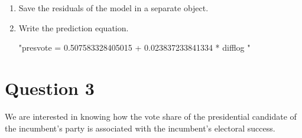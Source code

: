 \documentclass[12pt,letterpaper]{article}
\begin{document}
\begin{enumerate}
		\item Save the residuals of the model in a separate object.	
 	
		\item Write the prediction equation.
 	
"presvote = 0.507583328405015 + 0.023837233841334 * difflog "
	\end{enumerate}
	
	\newpage	
\section*{Question 3}

\noindent We are interested in knowing how the vote share of the presidential candidate of the incumbent's party is associated with the incumbent's electoral success.
	\vspace{.25cm}
\end{document}
